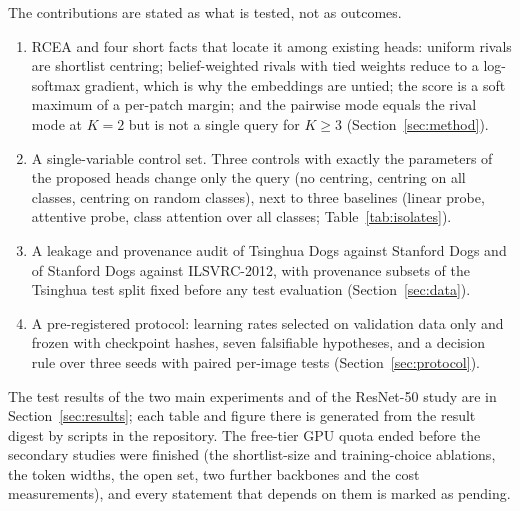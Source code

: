 \documentclass[11pt,a4paper]{article}
\theoremstyle{plain}
\begin{document}
The contributions are stated as what is tested, not as outcomes.
\begin{enumerate}[leftmargin=*,itemsep=2pt]
\item RCEA and four short facts that locate it among existing heads: uniform rivals are shortlist centring;
  belief-weighted rivals with tied weights reduce to a log-softmax gradient, which is why the embeddings are untied;
  the score is a soft maximum of a per-patch margin; and the pairwise mode equals the rival mode at $K=2$ but is not
  a single query for $K\ge3$ (Section~\ref{sec:method}).
\item A single-variable control set. Three controls with exactly the parameters of the proposed heads change only
  the query (no centring, centring on all classes, centring on random classes), next to three baselines (linear
  probe, attentive probe, class attention over all classes; Table~\ref{tab:isolates}).
\item A leakage and provenance audit of Tsinghua Dogs against Stanford Dogs and of Stanford Dogs against
  ILSVRC-2012, with provenance subsets of the Tsinghua test split fixed before any test evaluation
  (Section~\ref{sec:data}).
\item A pre-registered protocol: learning rates selected on validation data only and frozen with checkpoint hashes,
  seven falsifiable hypotheses, and a decision rule over three seeds with paired per-image tests
  (Section~\ref{sec:protocol}).
\end{enumerate}

The test results of the two main experiments and of the ResNet-50 study are in Section~\ref{sec:results}; each table
and figure there is generated from the result digest by scripts in the repository. The free-tier GPU quota ended
before the secondary studies were finished (the shortlist-size and training-choice ablations, the token widths, the
open set, two further backbones and the cost measurements), and every statement that depends on them is marked as
pending.
\end{document}
